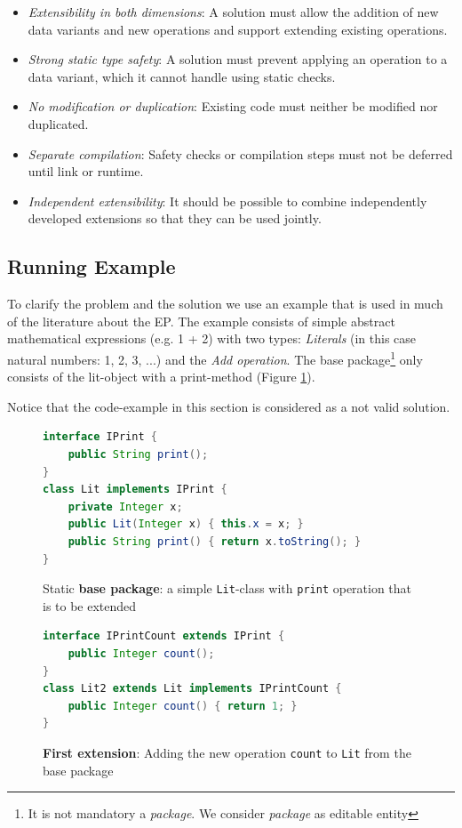 \documentclass{report}
\begin{document}
\begin{itemize}
  \item \emph{Extensibility in both dimensions}: A solution must allow the addition of new data variants and new operations and support extending existing operations.
  \item \emph{Strong static type safety}: A solution must prevent applying an operation to a data variant, which it cannot handle using static checks.
  \item \emph{No modification or duplication}: Existing code must neither be modified nor duplicated.
  \item \emph{Separate compilation}: Safety checks or compilation steps must not be deferred until link or runtime.
  \item \emph{Independent extensibility}: It should be possible to combine independently developed extensions so that they can be used jointly.
\end{itemize}


\subsection{Running Example}
\label{example}

To clarify the problem and the solution we use an example that is used in much of the literature about the EP. The example consists of simple abstract mathematical expressions (e.g. 1 + 2) with two types: \emph{Literals} (in this case natural numbers: 1, 2, 3, ...) and the \emph{Add operation}. The base package\footnote{It is not mandatory a \emph{package}. We consider \emph{package} as editable entity} only consists of the lit-object with a print-method (Figure \ref{exampleLitBaseClass}).

Notice that the code-example in this section is considered as a not valid solution.


\begin{figure}[H]
\begin{lstlisting}[language=java]
interface IPrint {
    public String print();
}
class Lit implements IPrint {
    private Integer x;
    public Lit(Integer x) { this.x = x; }
    public String print() { return x.toString(); }
}
\end{lstlisting}
\caption{Static \textbf{base package}: a simple \lstinline{Lit}-class with \lstinline{print} operation that is to be extended}
\label{exampleLitBaseClass}
\end{figure}
\begin{figure}[H]
\begin{lstlisting}[language=java]
interface IPrintCount extends IPrint {
    public Integer count();
}
class Lit2 extends Lit implements IPrintCount {
    public Integer count() { return 1; }
}
\end{lstlisting}
\caption{\textbf{First extension}: Adding the new operation \lstinline{count} to \lstinline{Lit} from the base package}
\label{exampleFirstExtension}
\end{figure}
\end{document}
